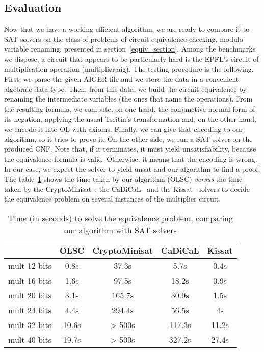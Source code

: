 \documentclass[a4paper, 11pt]{article}
\begin{document}
    \subsection{Evaluation}
    Now that we have a working efficient algorithm, we are ready to compare it to SAT solvers on the
    class of problems of circuit equivalence checking, modulo variable renaming, presented in 
    section~\ref{equiv_section}. Among the benchmarks we dispose, a circuit that appears to be
    particularly hard is the EPFL's circuit of multiplication operation (\textsf{multiplier.aig}). 
    The testing procedure is the
    following. First, we parse the given AIGER file and we store the data in a convenient algebraic
    data type. Then, from this data, we build the circuit equivalence by renaming the intermediate
    variables (the ones that name the operations). From the resulting formula, we compute, on one hand, 
    the conjunctive normal form of its negation, applying the usual Tseitin's transformation and, on 
    the other hand, we
    encode it into OL with axioms. Finally, we can give that encoding to our algorithm, so it tries
    to prove it. On the other side, we run a SAT solver on the produced CNF. Note that, if it terminates,
    it must yield unsatisfiability, because the equivalence formula is valid. Otherwise, it means that
    the encoding is wrong. 
    In our case, we expect the solver to yield unsat and our algorithm to find a proof.
    The table~\ref{benchmark_equiv} shows the time taken by our algorithm (OLSC) \textit{versus} the time
    taken by the CryptoMinisat~\cite{10.1007/978-3-642-02777-2_24},
    the CaDiCaL~\cite{BiereFallerFazekasFleuryFroleyks-CAV24} and the 
    Kissat~\cite{BiereFallerFazekasFleuryFroleyksPollitt-SAT-Competition-2024-solvers} solvers to decide 
    the equivalence problem on several instances of the multiplier circuit.
    \begin{table}[h] 
	    \begin{center}
		    \begin{tabular}{|c||c|c|c|c|}
			    \hline
			     &OLSC&CryptoMinisat&CaDiCaL&Kissat\\
			     \hline\hline
			     mult 12 bits&0.8s&37.3s&5.7s&0.4s\\
			     mult 16 bits&1.6s&97.5s&18.2s&0.9s\\
			     mult 20 bits&3.1s&165.7s&30.9s&1.5s\\
			     mult 24 bits&4.4s&294.4s&56.5s&4s\\
			     mult 32 bits&10.6s&> 500s&117.3s&11.2s\\
			     mult 40 bits&19.7s&> 500s&327.2s&27.4s\\
			     \hline
		    \end{tabular}
	    \end{center}
	    \caption{Time (in seconds) to solve the equivalence problem, comparing our algorithm with
	    SAT solvers}
	    \label{benchmark_equiv}
    \end{table}
\end{document}
